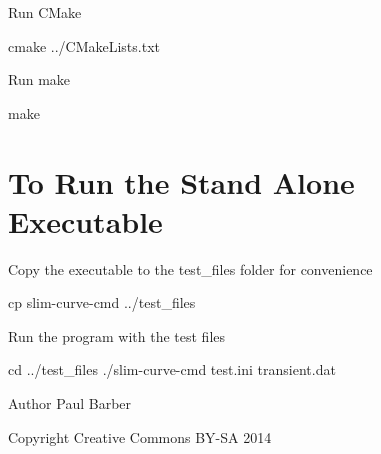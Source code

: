 Run C\-Make \begin{DoxyVerb}cmake ../CMakeLists.txt
\end{DoxyVerb}


Run make \begin{DoxyVerb}make
\end{DoxyVerb}


\section*{To Run the Stand Alone Executable}

Copy the executable to the test\-\_\-files folder for convenience \begin{DoxyVerb}cp slim-curve-cmd ../test_files
\end{DoxyVerb}


Run the program with the test files \begin{DoxyVerb}cd ../test_files
./slim-curve-cmd test.ini transient.dat
\end{DoxyVerb}


\begin{DoxyAuthor}{Author}
Paul Barber 
\end{DoxyAuthor}
\begin{DoxyCopyright}{Copyright}
Creative Commons B\-Y-\/\-S\-A 2014 
\end{DoxyCopyright}
